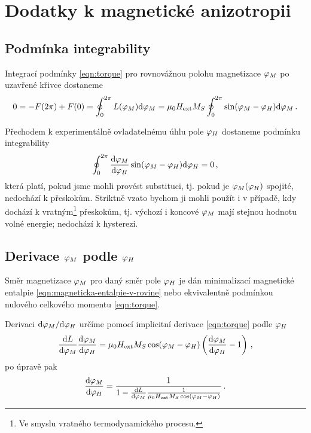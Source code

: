 \section{Dodatky k magnetické anizotropii}
\label{app:magneticka-anizotropie}

\subsection*{Podmínka integrability}

Integrací podmínky \eqref{eqn:torque} pro rovnovážnou polohu magnetizace $\varphi_M$ po uzavřené křivce dostaneme
\begin{equation}
    0 = - F(2\pi) + F(0) = \oint_0^{2\pi} L(\varphi_M) \textrm{d}\varphi_M = \mu_0 H_\textrm{ext} M_S \oint_0^{2\pi} \sin(\varphi_M-\varphi_H) \textrm{d}\varphi_M \,.
\end{equation}

Přechodem k experimentálně ovladatelnému úhlu pole $\varphi_H$ dostaneme podmínku integrability
\begin{equation}
    \oint_0^{2\pi} \frac{\textrm{d}\varphi_M}{\textrm{d}\varphi_H}\sin(\varphi_M-\varphi_H)\textrm{d}\varphi_H = 0 \,,
\end{equation}
která platí, pokud jsme mohli provést substituci, tj. pokud je $\varphi_M(\varphi_H)$ spojité, nedochází k přeskokům.
Striktně vzato bychom ji mohli použít i v případě, kdy dochází k vratným\footnote{Ve smyslu vratného termodynamického procesu.} přeskokům, tj. výchozí i koncové $\varphi_M$ mají stejnou hodnotu volné energie; nedochází k hysterezi.

\subsection*{Derivace $\varphi_M$ podle $\varphi_H$}

Směr magnetizace $\varphi_M$ pro daný směr pole $\varphi_H$ je dán minimalizací magnetické entalpie \eqref{eqn:magneticka-entalpie-v-rovine} nebo ekvivalentně podmínkou nulového celkového momentu \eqref{eqn:torque}.

Derivaci $\textrm{d}\varphi_M/\textrm{d}\varphi_H$ určíme pomocí implicitní derivace \eqref{eqn:torque} podle $\varphi_H$
\begin{equation}
    \frac{\textrm{d}L}{\textrm{d}\varphi_M}\frac{\textrm{d}\varphi_M}{\textrm{d}\varphi_H} = \mu_0H_\textrm{ext} M_S \cos(\varphi_M-\varphi_H)\left( \frac{\textrm{d}\varphi_M}{\textrm{d}\varphi_H} - 1  \right) \,,
\end{equation}
po úpravě pak 
\begin{equation}
    \label{eqn:app-integrabilita}
    \frac{\textrm{d}\varphi_M}{\textrm{d}\varphi_H} = \frac{1}{1-\frac{\textrm{d}L}{\textrm{d}\varphi_M}\frac{1}{\mu_0H_\textrm{ext} M_S \cos(\varphi_M-\varphi_H)}} \,.
\end{equation}

